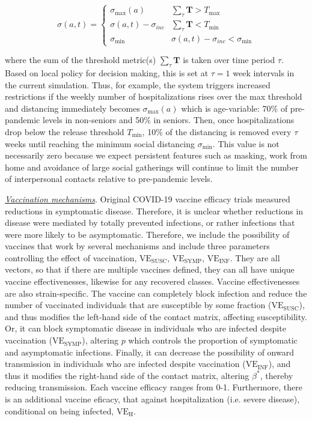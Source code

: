 \documentclass[11pt]{article}
\newcommand{\beq}{\begin{equation}}
\newcommand{\eeq}{\end{equation}}
\begin{document}
\beq
\sigma(a,t) = \begin{cases} 
    \sigma_{\max}(a) & \sum_{\tau} \mathbf{T}  > T_{\max} \\
    \sigma(a,t) - \sigma_{inc} &  \sum_{\tau} \mathbf{T} < T_{\min} \\
    \sigma_{\min} & \sigma(a,t) - \sigma_{inc}  < \sigma_{\min}
\end{cases}
\eeq

where the sum of the threshold metric(s) $\sum_{\tau} \mathbf{T}$ is taken over time period $\tau$. Based on local policy for decision making, this is set at $\tau=1$ week intervals in the current simulation. Thus, for example, the system triggers increased restrictions if the weekly number of hospitalizations rises over the max threshold and distancing immediately becomes $\sigma_{\max}(a)$ which is age-variable: 70\% of pre-pandemic levels in non-seniors and 50\% in seniors. Then, once hospitalizations drop below the release threshold $T_{\min}$, 10\% of the distancing is removed every $\tau$ weeks until reaching the minimum social distancing $\sigma_{\min}$. This value is not necessarily zero because we expect persistent features such as masking, work from home and avoidance of large social gatherings will continue to limit the number of interpersonal contacts relative to pre-pandemic levels.

\underline{\it Vaccination mechanisms}. Original COVID-19 vaccine efficacy trials measured reductions in symptomatic disease. Therefore, it is unclear whether reductions in disease were mediated by totally prevented infections, or rather infections that were more likely to be asymptomatic. Therefore, we include the possibility of vaccines that work by several mechanisms and include three parameters controlling the effect of vaccination, $\mathrm{VE_{SUSC}}$, $\mathrm{VE_{SYMP}}$, $\mathrm{VE_{INF}}$. They are all vectors, so that if there are multiple vaccines defined, they can all have unique vaccine effectivenesses, likewise for any recovered classes. Vaccine effectivenesses are also strain-specific. The vaccine can completely block infection and reduce the number of vaccinated individuals that are susceptible by some fraction ($\mathrm{VE_{SUSC}}$), and thus modifies the left-hand side of the contact matrix, affecting susceptibility. Or, it can block symptomatic disease in individuals who are infected despite vaccination ($\mathrm{VE_{SYMP}}$), altering $p$ which controls the proportion of symptomatic and asymptomatic infections. Finally, it can decrease the possibility of onward transmission in individuals who are infected despite vaccination ($\mathrm{VE_{INF}}$), and thus it modifies the right-hand side of the contact matrix, altering $\beta^*$, thereby reducing transmission. Each vaccine efficacy ranges from 0-1. Furthermore, there is an additional vaccine eficacy, that against hospitalization (i.e. severe disease), conditional on being infected, $\mathrm{VE_{H}}$.
\end{document}
